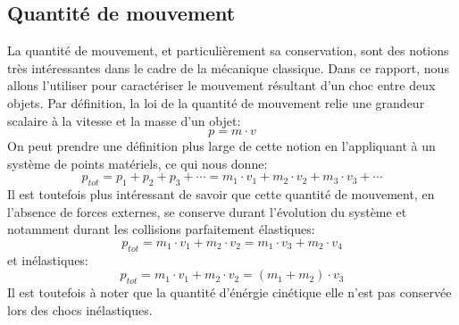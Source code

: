 \subsection{Quantité de mouvement}
La quantité de mouvement, et particulièrement sa conservation, sont des notions très intéressantes dans le cadre de la mécanique classique. Dans ce rapport, nous allons l'utiliser pour caractériser le mouvement résultant d'un choc entre deux objets.
Par définition, la loi de la quantité de mouvement relie une grandeur scalaire à la vitesse et la masse d'un objet:
\begin{equation}
    p = m \cdot v
\end{equation}
On peut prendre une définition plus large de cette notion en l'appliquant à un système de points matériels, ce qui nous donne:
\begin{equation}
    p_{tot} = p_1 + p_2 + p_3 +\cdots = m_1 \cdot v_1 + m_2 \cdot v_2 + m_3 \cdot v_3 +\cdots
\end{equation}
Il est toutefois plus intéressant de savoir que cette quantité de mouvement, en l'absence de forces externes, se conserve durant l'évolution du système et notamment durant les collisions parfaitement élastiques:
\begin{equation}
    p_{tot} = m_1 \cdot v_1 + m_2 \cdot v_2 = m_1 \cdot v_3 + m_2 \cdot v_4
\end{equation}
et inélastiques:
\begin{equation}
    p_{tot} = m_1 \cdot v_1 + m_2 \cdot v_2 = (m_1 + m_2) \cdot v_3
\end{equation}
Il est toutefois à noter que la quantité d'énérgie cinétique elle n'est pas conservée lors des chocs inélastiques.
